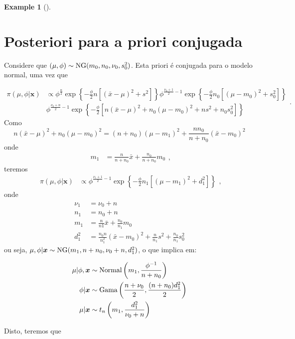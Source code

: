 \documentclass[
  letterpaper,
  DIV=11,
  numbers=noendperiod]{scrreprt}
\theoremstyle{definition}
\theoremstyle{plain}
\theoremstyle{definition}
\newtheorem{example}{Example}[chapter]
\theoremstyle{remark}
\begin{document}
\begin{example}[]
\section{Posteriori para a priori
conjugada}\label{posteriori-para-a-priori-conjugada}

Considere que \((\mu,\phi)\sim \hbox{NG}(m_0,n_0,\nu_0,s^2_0)\). Esta
priori é conjugada para o modelo normal, uma vez que

\[\begin{align}
\pi(\mu,\phi|\boldsymbol{x})&\propto \phi^{\frac{n}{2}}\exp\left\{-\frac{\phi}{2}n\left[(\bar{x}-\mu)^2+ s^2\right]\right\}\phi^{\frac{\nu_0+1}{2}-1}\exp\left\{-\frac{\phi}{2}n_0\left[(\mu-m_0)^2 + s_0^2\right]\right\}\\
&\phi^{\frac{\nu_0+n}{2}-1}\exp\left\{-\frac{\phi}{2}\left[n(\bar{x}-\mu)^2 + n_0(\mu-m_0)^2+ns^2 + n_0s^2_0\right]\right\}\end{align}.\]
Como
\[n(\bar{x}-\mu)^2 +n_0(\mu-m_0)^2 = (n+n_0)(\mu-m_1)^2+\frac{n n_0}{n+n_0}(\bar{x}-m_0)^2\]
onde \[\begin{align}
m_1&=\frac{n}{n+n_0}\bar{x}+\frac{n_0}{n+n_0}m_0
\end{align},\] teremos \[\begin{align}
\pi(\mu,\phi|\boldsymbol{x})&\propto \phi^{\frac{\nu_1+1}{2}-1}\exp\left\{-\frac{\phi}{2}n_1\left[(\mu-m_1)^2 + d_1^2\right]\right\}\end{align},\]
onde \[\begin{align}
\nu_1&=\nu_0+n\\
n_1&=n_0+n\\
m_1&=\frac{n}{n1}\bar{x}+\frac{n_0}{n_1}m_0\\
d_1^2& = \frac{n_0n}{n_1^2}(\bar{x}-m_0)^2+\frac{n}{n_1}s^2 + \frac{n_0}{n_1}s^2_0
\end{align}\] ou seja,
\(\mu,\phi|\boldsymbol{x}\sim\hbox{NG}(m_1,n+n_0,\nu_0+n,d_1^2)\), o que
implica em:

\[\begin{align}
\mu|\phi,\boldsymbol{x}&\sim\hbox{Normal}\left(m_1,\frac{\phi^{-1}}{n+n_0}\right)\\
\phi|\boldsymbol{x}&\sim\hbox{Gama}\left(\frac{n+\nu_0}{2},\frac{(n+n_0)d_1^2}{2}\right)\\
\mu|\boldsymbol{x}&\sim t_{n}\left(m_1,\frac{d^2_1}{\nu_0+n}\right)
\end{align}\]

Disto, teremos que


\end{example}
\end{document}
